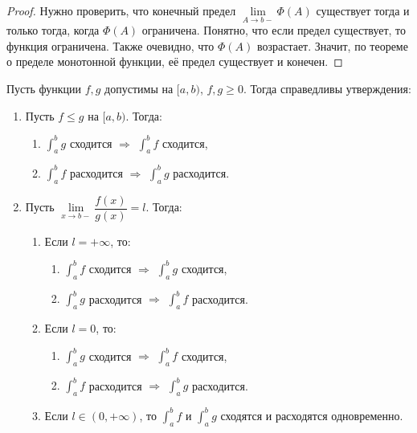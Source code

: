 \begin{proof}
	Нужно проверить, что конечный предел \(\lim\limits_{A \to b-} \Phi(A)\) существует тогда и только тогда, когда \(\Phi(A)\) ограничена. Понятно, что если предел существует, то функция ограничена. Также очевидно, что \(\Phi(A)\) возрастает. Значит, по теореме о пределе монотонной функции, её предел существует и конечен. 
\end{proof}

\hypertarget{priz}{}
\begin{theorem}
	Пусть функции \(f, g\) допустимы на \([a, b)\), \(f, g \geqslant 0\). Тогда справедливы утверждения:
	\begin{enumerate}
		\item Пусть \(f \leqslant g\) на \([a, b)\). Тогда:
		\begin{enumerate}
			\item \(\int_a^b g\) сходится \(\Rightarrow\) \(\int_a^b f\) сходится,
			\item \(\int_a^b f\) расходится \(\Rightarrow\) \(\int_a^b g\) расходится.
		\end{enumerate}
		\item Пусть \(\lim\limits_{x \to b-} \dfrac{f(x)}{g(x)} = l\). Тогда:
		\begin{enumerate}
			\item Если \(l = +\infty\), то:
			\begin{enumerate}
				\item \(\int_a^b f\) сходится \(\Rightarrow\) \(\int_a^b g\) сходится,
				\item \(\int_a^b g\) расходится \(\Rightarrow\) \(\int_a^b f\) расходится.
			\end{enumerate}
			\item Если \(l = 0\), то:
			\begin{enumerate}
				\item \(\int_a^b g\) сходится \(\Rightarrow\) \(\int_a^b f\) сходится,
				\item \(\int_a^b f\) расходится \(\Rightarrow\) \(\int_a^b g\) расходится.
			\end{enumerate}
			\item Если \(l \in (0, +\infty)\), то \(\int_a^b f\) и \(\int_a^b g\) сходятся и расходятся одновременно.
		\end{enumerate}
	\end{enumerate}
\end{theorem}

